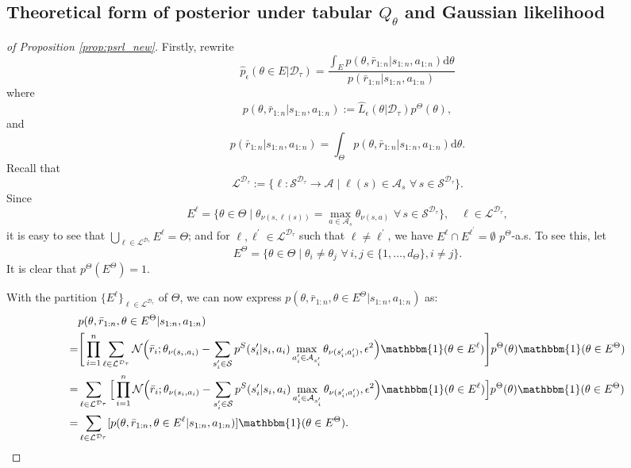 \documentclass{amsart}
\begin{document}
 \subsection{Theoretical form of posterior under tabular \texorpdfstring{$Q_\theta$}{Qθ} and Gaussian likelihood}
 \label{apd:proofpsrl}

\begin{proof}[of Proposition \ref{prop:psrl_new}]
Firstly, rewrite $$\hat{p}_\epsilon(\theta \in E|\mathcal{D}_\tau) = \frac{\int_{E}p(\theta,\bar{r}_{1:n}|s_{1:n},a_{1:n})\mathrm{d}\theta}{p(\bar{r}_{1:n}|s_{1:n},a_{1:n})}$$
where
$$p(\theta,\bar{r}_{1:n}|s_{1:n},a_{1:n}) :=\hat{L}_\epsilon(\theta|\mathcal{D}_\tau) p^\Theta(\theta),$$
and
$$p(\bar{r}_{1:n}|s_{1:n},a_{1:n}) = \int_\Theta p(\theta,\bar{r}_{1:n}|s_{1:n},a_{1:n})\mathrm{d} \theta.$$
Recall that
$$\mathcal{L}^{\mathcal{D}_\tau} := \{\ell : \mathcal{S}^{\mathcal{D}_\tau} \rightarrow \mathcal{A} \mid \ell(s) \in \mathcal{A}_s \,\, \forall \, s \in \mathcal{S}^{\mathcal{D}_\tau}\}.$$
Since
$$E^\ell = \{\theta \in \Theta \mid \theta_{\nu(s,\ell(s))} = \max_{a \in \mathcal{A}_s} \theta_{\nu(s,a)} \,\,\forall \,s\in \mathcal{S}^{\mathcal{D}_{\tau}}\}, \quad \ell \in \mathcal{L}^{\mathcal{D}_\tau},$$
it is easy to see that $\bigcup_{\ell \in \mathcal{L}^{\mathcal{D}_\tau}} E^\ell = \Theta$; and for $\ell,\ell^\prime \in \mathcal{L}^{\mathcal{D}_\tau}$ such that $\ell \neq \ell^\prime$, we have $E^\ell \cap E^{\ell^\prime} = \emptyset$ $p^\Theta$-a.s. To see this, let 
$$E^\Theta = \{\theta \in \Theta \mid \theta_i \neq \theta_j \,\,\forall \, i,j \in \{1,\dots,d_{\Theta}\}, i \neq j\}.$$
It is clear that $p^\Theta(E^\Theta)=1$.

With the partition $\{E^\ell\}_{\ell \in \mathcal{L}^{\mathcal{D}_\tau}}$ of $\Theta$, we can now express $p(\theta,\bar{r}_{1:n},\theta \in E^\Theta|s_{1:n},a_{1:n})$ as:
\begin{align*}
&p(\theta,\bar{r}_{1:n},\theta \in E^\Theta|s_{1:n},a_{1:n}) \\
=& \Bigg[ \prod_{i=1}^n \sum_{\ell \in \mathcal{L}^{\mathcal{D}_\tau}} \mathcal{N}\Big(\bar{r}_i;\theta_{\nu(s_i,a_i)}-\sum_{s_i^\prime \in \mathcal{S}} p^S(s_i^\prime|s_i,a_i)\max_{a_i^\prime \in \mathcal{A}_{s_i^\prime}}\theta_{\nu(s_i^\prime,a_i^\prime)},\epsilon^2\Big) \mathbbm{1}(\theta \in E^{\ell})\Bigg] p^\Theta(\theta) \mathbbm{1}(\theta \in E^\Theta)\\
=& \sum_{\ell \in \mathcal{L}^{\mathcal{D}_\tau}} \Big[ \prod_{i=1}^n \mathcal{N} \Big(\bar{r}_i;\theta_{\nu(s_i,a_i)}- \sum_{s_i^\prime \in \mathcal{S}} p^S(s_i^\prime|s_i,a_i)\max_{a_i^\prime \in \mathcal{A}_{s_i^\prime}}\theta_{\nu(s_i^\prime,a_i^\prime)}, \epsilon^2 \Big) \mathbbm{1}(\theta \in E^{\ell}) \Big] p^\Theta(\theta)\mathbbm{1}(\theta \in E^\Theta) \\
=& \sum_{\ell \in \mathcal{L}^{\mathcal{D}_\tau}} [p(\theta,\bar{r}_{1:n},\theta \in E^{\ell}|s_{1:n},a_{1:n})]\mathbbm{1}(\theta \in E^\Theta).
\end{align*}



\end{proof}
\end{document}
